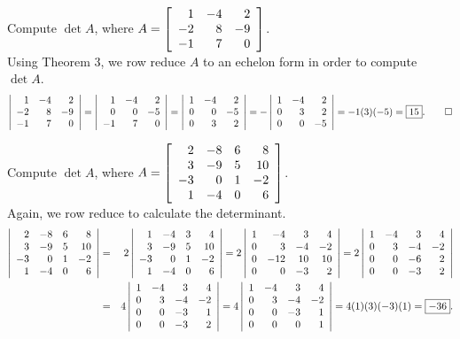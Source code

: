 \begin{Exam} Compute $\det A$, where $A = \mtx{rrr}{1&-4&2\\-2&8&-9\\-1&7&0}$.\\

Using Theorem 3, we row reduce $A$ to an echelon form in order to compute $\det A$.
\[ \dtx{rrr}{1&-4&2\\-2&8&-9\\-1&7&0} =  \dtx{rrr}{1&-4&2\\0&0&-5\\-1&7&0} =  \dtx{rrr}{1&-4&2\\0&0&-5\\0&3&2} = -\dtx{rrr}{1&-4&2\\0&3&2\\0&0&-5} = -1(3)(-5) = \fbox{$15$}. \qedhere\]
\end{Exam}\vs

\begin{Exam} Compute $\det A$, where $A = \mtx{rrrr}{2&-8&6&8\\3&-9&5&10\\-3&0&1&-2\\1&-4&0&6}$.\\

Again, we row reduce to calculate the determinant.
\begin{eqnarray*}
\dtx{rrrr}{2&-8&6&8\\3&-9&5&10\\-3&0&1&-2\\1&-4&0&6} &=& 2\dtx{rrrr}{1&-4&3&4\\3&-9&5&10\\-3&0&1&-2\\1&-4&0&6} = 2\dtx{rrrr}{1&-4&3&4\\0&3&-4&-2\\0&-12&10&10\\0&0&-3&2} = 2\dtx{rrrr}{1&-4&3&4\\0&3&-4&-2\\0&0&-6&2\\0&0&-3&2}\\
& =& 4\dtx{rrrr}{1&-4&3&4\\0&3&-4&-2\\0&0&-3&1\\0&0&-3&2} =4\dtx{rrrr}{1&-4&3&4\\0&3&-4&-2\\0&0&-3&1\\0&0&0&1} = 4(1)(3)(-3)(1)=\fbox{$-36$}. 
\end{eqnarray*}
\end{Exam}


